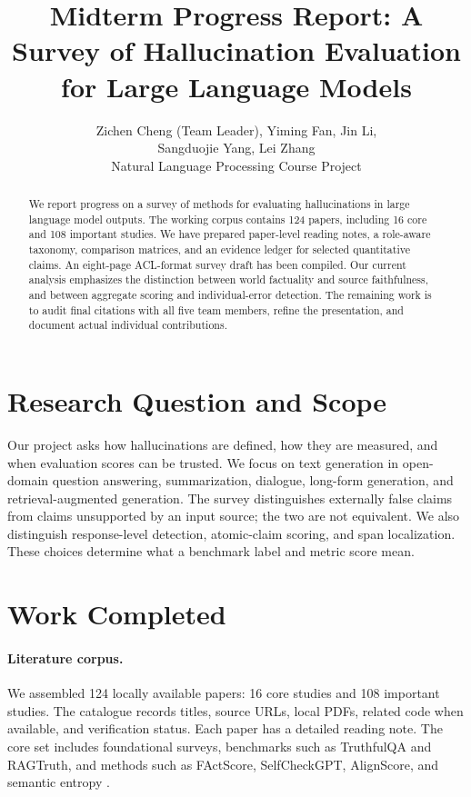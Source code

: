 \documentclass[11pt]{article}
\title{Midterm Progress Report: A Survey of Hallucination Evaluation for Large Language Models}
\author{Zichen Cheng (Team Leader), Yiming Fan, Jin Li,\\ Sangduojie Yang, Lei Zhang\\ Natural Language Processing Course Project}
\begin{document}
\maketitle

\begin{abstract}
We report progress on a survey of methods for evaluating hallucinations in large language model outputs. The working corpus contains 124 papers, including 16 core and 108 important studies. We have prepared paper-level reading notes, a role-aware taxonomy, comparison matrices, and an evidence ledger for selected quantitative claims. An eight-page ACL-format survey draft has been compiled. Our current analysis emphasizes the distinction between world factuality and source faithfulness, and between aggregate scoring and individual-error detection. The remaining work is to audit final citations with all five team members, refine the presentation, and document actual individual contributions.
\end{abstract}

\section{Research Question and Scope}
Our project asks how hallucinations are defined, how they are measured, and when evaluation scores can be trusted. We focus on text generation in open-domain question answering, summarization, dialogue, long-form generation, and retrieval-augmented generation. The survey distinguishes externally false claims from claims unsupported by an input source; the two are not equivalent. We also distinguish response-level detection, atomic-claim scoring, and span localization. These choices determine what a benchmark label and metric score mean.

\section{Work Completed}
\paragraph{Literature corpus.} We assembled 124 locally available papers: 16 core studies and 108 important studies. The catalogue records titles, source URLs, local PDFs, related code when available, and verification status. Each paper has a detailed reading note. The core set includes foundational surveys, benchmarks such as TruthfulQA and RAGTruth, and methods such as FActScore, SelfCheckGPT, AlignScore, and semantic entropy \citep{C05,C07,C08,C09,C10,C12}.
\end{document}
